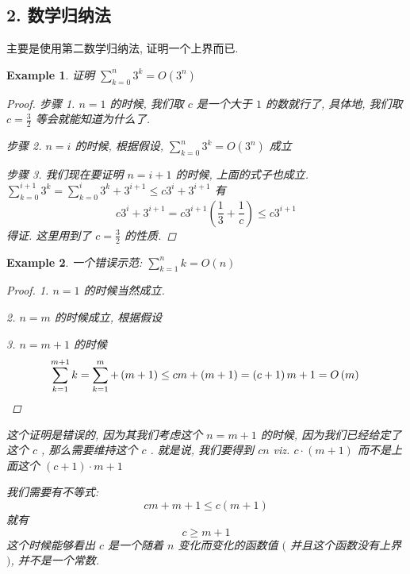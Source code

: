 \documentclass[a4paper, 10pt]{ctexart} %
\newtheorem{example}{Example}
\begin{document}
\subsection{2. 数学归纳法}
主要是使用第二数学归纳法, 证明一个上界而已. 
\begin{example}
证明 $\displaystyle \sum_{k=0}^{n} 3^{k} = O\left(3 ^{n}\right)$
\begin{proof}
步骤 1. $n = 1$ 的时候, 我们取 $c$ 是一个大于 $1$ 的数就行了, 具体地, 我们取 $c = \frac{3}{2}$ 等会就能知道为什么了. 

步骤 2. $n  = i$ 的时候, 根据假设, $\displaystyle \sum_{k=0} ^{n} 3^{k} = O \left(3^{n}\right)$ 成立

步骤 3. 我们现在要证明 $n   = i+1$ 的时候, 上面的式子也成立. $\sum_{k=0} ^{i+ 1} 3^{k} =\sum_{k=0} ^{i}   3^{k} + 3 ^{i +1} \le c 3 ^{i} + 3 ^{i + 1}$
有
\[
c 3 ^{i} +  3 ^{i+1} = c 3^{i+1} \left( \frac{1}{3} + \frac{1}{c}\right) \le c 3 ^{i+1}
\] 
得证. 
这里用到了 $c = \frac{3}{2} $ 的性质. 
\end{proof}
\end{example}
\begin{example}
    一个错误示范: $\sum_{k=1} ^{n} k = O\left(n\right)$
    \begin{proof}
        1. $n= 1$ 的时候当然成立. 

        2. $n = m $ 的时候成立, 根据假设

        3. $n = m + 1$ 的时候
        \[
        \sum_{k=1} ^{m +1 } k =  \sum_{k=1} ^{m} + \left(m  + 1\right) \le cm + \left(m + 1\right) = \left(c+1\right) m +1 = O\left(m\right) \qedhere
        \]
    \end{proof}
    这个证明是错误的, 因为其我们考虑这个 $n =  m +1$ 的时候, 因为我们已经给定了这个 $c$ , 那么需要维持这个 $c$ . 就是说, 我们要得到 
    $c n$ viz. $ c\cdot \left( m+1\right)$ 
    而不是上面这个 $\left(c + 1\right) \cdot  m +  1    $
    
    我们需要有不等式: 
    $$ c m + m + 1 \le c \left( m + 1\right)$$
    就有 
    $$c \ge m+1$$ 这个时候能够看出 $c$ 是一个随着 $n$ 变化而变化的函数值 $($ 并且这个函数没有上界 $)$, 并不是一个常数. 
\end{example}
\end{document}
